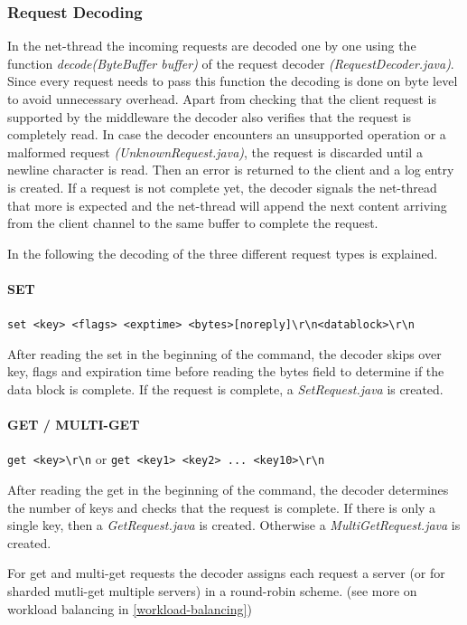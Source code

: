 \documentclass[11pt,a4paper]{article}
\begin{document}
\subsubsection{Request Decoding}\label{request-decoding}
In the net-thread the incoming requests are decoded one by one using the function \emph{decode(ByteBuffer buffer)} of the request decoder \emph{(RequestDecoder.java)}.
Since every request needs to pass this function the decoding is done on byte level to avoid unnecessary overhead.
Apart from checking that the client request is supported by the middleware the decoder also verifies that the request is completely read. In case the decoder encounters an unsupported operation or a malformed request \emph{(UnknownRequest.java)}, the request is discarded until a newline character is read. Then an error is returned to the client and a log entry is created. If a request is not complete yet, the decoder signals the net-thread that more is expected and the net-thread will append the next content arriving from the client channel to the same buffer to complete the request.

In the following the decoding of the three different request types is explained. 

\paragraph{SET} \texttt{set <key> <flags> <exptime> <bytes>[noreply]\textbackslash r\textbackslash n<datablock>\textbackslash r\textbackslash n} 

After reading the set in the beginning of the command, the decoder skips over key, flags and expiration time before reading the bytes field to determine if the data block is complete. If the request is complete, a \emph{SetRequest.java} is created.

\paragraph{GET / MULTI-GET} \texttt{get <key>\textbackslash r\textbackslash n} or \texttt{get <key1> <key2> ... <key10>\textbackslash r\textbackslash n}

After reading the get in the beginning of the command, the decoder determines the number of keys and checks that the request is complete. If there is only a single key, then a \emph{GetRequest.java} is created. Otherwise a \emph{MultiGetRequest.java} is created.

For get and multi-get requests the decoder assigns each request a server (or for sharded mutli-get multiple servers) in a round-robin scheme. (see more on workload balancing in \ref{workload-balancing})
\end{document}

